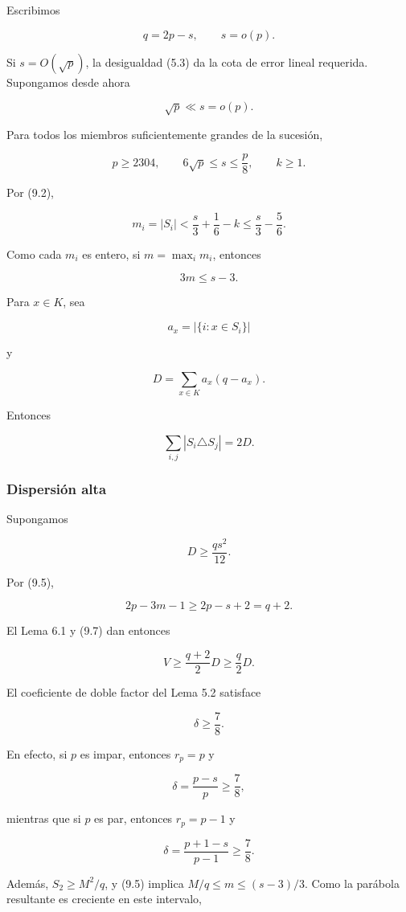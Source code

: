 \documentclass[
  11pt,
]{article}
\begin{document}
Escribimos

\[
q=2p-s,
\qquad
s=o(p).
\]

Si \(s=O(\sqrt p)\), la desigualdad (5.3) da la cota de error lineal
requerida. Supongamos desde ahora

\[
\sqrt p\ll s=o(p).
\tag{9.3}
\]

Para todos los miembros suficientemente grandes de la sucesión,

\[
p\ge2304,
\qquad
6\sqrt p\le s\le\frac p8,
\qquad
k\ge1.
\tag{9.4}
\]

Por (9.2),

\[
m_i=|S_i|
<
\frac s3+\frac16-k
\le
\frac s3-\frac56.
\]

Como cada \(m_i\) es entero, si \(m=\max_i m_i\), entonces

\[
\boxed{3m\le s-3.}
\tag{9.5}
\]

Para \(x\in K\), sea

\[
a_x=|\{i:x\in S_i\}|
\]

y

\[
D=\sum_{x\in K}a_x(q-a_x).
\tag{9.6}
\]

Entonces

\[
\sum_{i,j}|S_i\triangle S_j|=2D.
\tag{9.7}
\]

\subsubsection{Dispersión alta}\label{dispersiuxf3n-alta}

Supongamos

\[
D\ge\frac{qs^2}{12}.
\tag{9.8}
\]

Por (9.5),

\[
2p-3m-1\ge2p-s+2=q+2.
\]

El Lema 6.1 y (9.7) dan entonces

\[
V
\ge
\frac{q+2}{2}D
\ge
\frac q2D.
\tag{9.9}
\]

El coeficiente de doble factor del Lema 5.2 satisface

\[
\boxed{\delta\ge\frac78.}
\tag{9.10}
\]

En efecto, si \(p\) es impar, entonces \(r_p=p\) y

\[
\delta=\frac{p-s}{p}\ge\frac78,
\]

mientras que si \(p\) es par, entonces \(r_p=p-1\) y

\[
\delta=\frac{p+1-s}{p-1}\ge\frac78.
\]

Además, \(S_2\ge M^2/q\), y (9.5) implica \(M/q\le m\le(s-3)/3\). Como
la parábola resultante es creciente en este intervalo,
\end{document}
